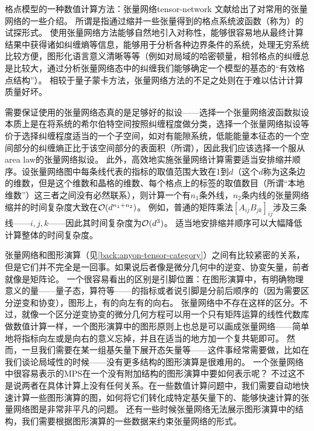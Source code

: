 \begin{back}{格点模型的一种数值计算方法：张量网络}{tensor-network}
    文献\cite{Orus_tensor}给出了对常用的张量网络的一些介绍。
    所谓是指通过缩并一些张量得到的格点系统波函数（称为）的试探形式。
    使用张量网络方法能够自然地引入对称性，能够很容易地从最终计算结果中获得诸如纠缠熵等信息，能够用于分析各种边界条件的系统，处理无穷系统比较方便，图形化语言意义清晰等等（例如对局域的哈密顿量，相邻格点的纠缠总是比较大，通过分析张量网络态中的纠缠我们能够确定一个模型的基态的“有效格点结构”）。
    相较于量子蒙卡方法，张量网络方法的不足之处则在于难以估计计算质量好坏。

    需要保证使用的张量网络态真的是足够好的拟设——选择一个张量网络波函数拟设本质上是在将系统的希尔伯特空间按照纠缠程度做分类，选择一个张量网络拟设等价于选择纠缠程度适当的一个子空间，如对有能隙系统，低能能量本征态的一个空间部分的纠缠熵正比于该空间部分的表面积（所谓），因此我们应该选择一个服从area law的张量网络拟设。
    此外，高效地实施张量网络计算需要适当安排缩并顺序。设张量网络图中每条线代表的指标的取值范围大致在1到$d$（这个$d$称为这条边的维数，但是这个维数和晶格的维数、每个格点上的标签的取值数目（所谓“本地维数”）这三者之间没有必然联系），则计算一个有$n_1$条外线，$n_2$条内线的张量网络缩并的时间复杂度大致在$\mathcal{O}(d^{n_1+n_2})$。
    例如，普通的矩阵乘法$[A_{ij} B_{jk}]_{ij}$涉及三条线——$i, j, k$——因此其时间复杂度为$\mathcal{O}(d^3)$。
    适当地安排缩并顺序可以大幅降低计算整体的时间复杂度。

    张量网络和图形演算（见\autoref{back:anyon-tensor-category}）之间有比较紧密的关系，但是它们并不完全是一回事。如果说后者像是微分几何中的逆变、协变矢量，前者就像是矩阵论。
    一个很容易看出的区别是引脚位置：在图形演算中，有明确物理意义的量——量子态，算符等——的指标或者说引脚是分前后顺序的（因为需要区分逆变和协变），图形上，有的向左有的向右。
    张量网络中不存在这样的区分。不过，就像一个区分逆变协变的微分几何方程可以用一个只有矩阵运算的线性代数库做数值计算一样，一个图形演算中的图形原则上也总是可以画成张量网络——简单地将指标向左或是向右的意义忘掉，并且在适当的地方加一个复共轭即可。
    然而，一旦我们需要在某一组基矢量下展开态矢量等——这件事经常需要做，比如在我们谈论局域性的时候——没有更多结构的图形演算是很难用的。
    一个张量网络中很容易表示的MPS在一个没有附加结构的图形演算中要如何表示呢？
    不过这不是说两者在具体计算上没有任何关系。在一些数值计算问题中，我们需要自动地快速计算一些图形演算的图，如何将它们转化成特定基矢量下的、能够快速计算的张量网络图是非常非平凡的问题。
    还有一些时候张量网络无法展示图形演算中的结构，我们需要根据图形演算的一些数据来约束张量网络的形式。


\end{back}
